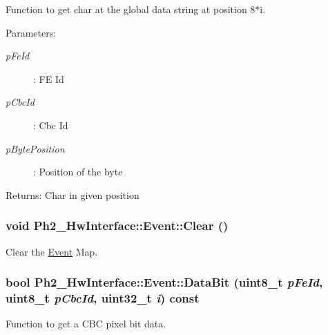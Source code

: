 Function to get char at the global data string at position 8$\ast$i. 

\begin{Desc}
\item[Parameters:]
\begin{description}
\item[{\em p\-Fe\-Id}]: FE Id \item[{\em p\-Cbc\-Id}]: Cbc Id \item[{\em p\-Byte\-Position}]: Position of the byte \end{description}
\end{Desc}
\begin{Desc}
\item[Returns:]Char in given position \end{Desc}
\hypertarget{class_ph2___hw_interface_1_1_event_c324585a7a75fb07c51e71317e53ea64}{
\subsubsection[Clear]{\setlength{\rightskip}{0pt plus 5cm}void Ph2\_\-Hw\-Interface::Event::Clear ()}}
\label{class_ph2___hw_interface_1_1_event_c324585a7a75fb07c51e71317e53ea64}


Clear the \hyperlink{class_ph2___hw_interface_1_1_event}{Event} Map. 

\hypertarget{class_ph2___hw_interface_1_1_event_3e93e6f16944f443caffd2df81262fbe}{
\subsubsection[DataBit]{\setlength{\rightskip}{0pt plus 5cm}bool Ph2\_\-Hw\-Interface::Event::Data\-Bit (uint8\_\-t {\em p\-Fe\-Id}, uint8\_\-t {\em p\-Cbc\-Id}, uint32\_\-t {\em i}) const}}
\label{class_ph2___hw_interface_1_1_event_3e93e6f16944f443caffd2df81262fbe}


Function to get a CBC pixel bit data. 

